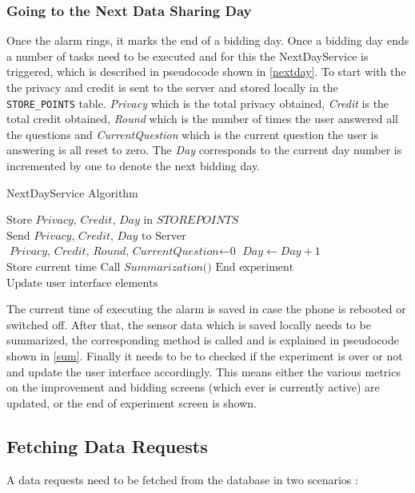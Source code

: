 \subsubsection{Going to the Next Data Sharing Day} \label{next}
Once the alarm rings, it marks the end of a bidding day. Once a bidding day ends a number of tasks need to be executed
and for this the NextDayService is triggered, which is described in pseudocode shown in \ref{nextday}. To start with the the privacy and credit is sent to the server and stored locally in the \texttt{STORE\_POINTS} table. \textit{Privacy} which is the total privacy obtained, \textit{Credit} is the total credit obtained, \textit{Round} which is the number of times the user answered all the questions and \textit{CurrentQuestion} which is the current question the user is answering is all reset to zero. The \textit{Day} corresponds to the current day number is incremented by one to denote the next bidding day.

\begin{algorithm}
\caption{NextDayService Algorithm}\label{nextday}
\begin{algorithmic}[1]
\State $\text{Store }\textit{Privacy, Credit, Day } \text{in } \textit{STOREPOINTS}$
\State $\text{Send }\textit{Privacy, Credit, Day } \text{to Server}$
\State $\textit{Privacy, Credit, Round, CurrentQuestion} \gets \text{0}$
\State $\textit{Day} \gets \textit{Day}+1$
\State $\text{Store current time}$
\State $\text{Call }\textit{Summarization()}$
  \State $\text{End experiment}$
\Else
  \State $\text{Update user interface elements}$ 
\EndIf
\EndProcedure
\end{algorithmic}
\end{algorithm}

The current time of executing the alarm is saved in case the phone is rebooted or switched off. After that, the sensor data which is saved locally
needs to be summarized, the corresponding method is called and is explained in pseudocode shown in \ref{sum}. Finally it needs to be to checked if the experiment is over or not and update the user interface accordingly. This means either the various metrics on the improvement and bidding screens (which ever is currently active) are updated, or
the end of experiment screen is shown.

\subsection{Fetching Data Requests} \label{data_req}
A data requests need to be fetched from the database in two scenarios :

